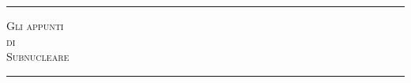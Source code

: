 \begin{titlingpage}    
    \begin{center}
        \vspace*{\fill}
        \hrule
        \vspace{1cm}
        \Huge{\textsc{Gli appunti\\di\\Subnucleare}}
        \vspace{1cm}
        \hrule
        \vspace*{\fill}
    \end{center}
\end{titlingpage}
\restoregeometry